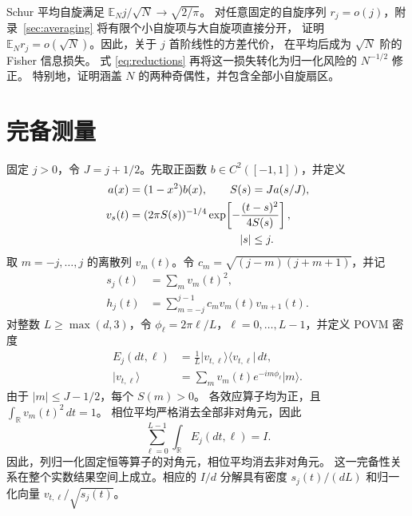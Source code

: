 \documentclass[aps,pra,reprint,superscriptaddress,longbibliography]{revtex4-2}
\theoremstyle{remark}
\newcommand{\R}{\mathbb R}
\newcommand{\ket}[1]{\lvert#1\rangle}
\newcommand{\bra}[1]{\langle#1\rvert}
\begin{document}
Schur 平均自旋满足 $\mathbb E_N j/\sqrt N\to\sqrt{2/\pi}$。
对任意固定的自旋序列 $r_j=o(j)$，附录~\ref{sec:averaging} 将有限个小自旋项与大自旋项直接分开，
证明 $\mathbb E_N r_j=o(\sqrt N)$。因此，关于 $j$ 首阶线性的方差代价，
在平均后成为 $\sqrt N$ 阶的 Fisher 信息损失。
式 \eqref{eq:reductions} 再将这一损失转化为归一化风险的 $N^{-1/2}$ 修正。
特别地，证明涵盖 $N$ 的两种奇偶性，并包含全部小自旋扇区。

\section{完备测量}\label{sec:gaussian}

固定 $j>0$，令 $J=j+1/2$。先取正函数 $b\in C^2([-1,1])$，并定义
\begin{equation}
\begin{aligned}
a(x)&=(1-x^2)b(x),\qquad S(s)=Ja(s/J),\\
v_s(t)&=(2\pi S(s))^{-1/4}
 \exp\!\left[-\frac{(t-s)^2}{4S(s)}\right],\\
&\hspace{35mm}|s|\leq j.
\end{aligned}
\label{eq:columns}
\end{equation}
取 $m=-j,\ldots,j$ 的离散列 $v_m(t)$。令 $c_m=\sqrt{(j-m)(j+m+1)}$，并记
\begin{equation}
\begin{aligned}
s_j(t)&=\sum_m v_m(t)^2,\\
h_j(t)&=\sum_{m=-j}^{j-1}c_mv_m(t)v_{m+1}(t).
\end{aligned}
\label{eq:sh}
\end{equation}
对整数 $L\geq\max(d,3)$，令 $\phi_\ell=2\pi\ell/L$，$\ell=0,\ldots,L-1$，并定义 POVM 密度
\begin{equation}
\begin{aligned}
E_j(dt,\ell)&=\frac1L\ket{v_{t,\ell}}\bra{v_{t,\ell}}\,dt,\\
\ket{v_{t,\ell}}&=\sum_m v_m(t)e^{-im\phi_\ell}\ket m.
\end{aligned}
\label{eq:gaussian-povm}
\end{equation}
由于 $|m|\leq J-1/2$，每个 $S(m)>0$。
各效应算子均为正，且 $\int_\R v_m(t)^2\,dt=1$。
相位平均严格消去全部非对角元，因此
\begin{equation}
 \sum_{\ell=0}^{L-1}\int_\R E_j(dt,\ell)=I.
 \label{eq:complete}
\end{equation}
因此，列归一化固定恒等算子的对角元，相位平均消去非对角元。
这一完备性关系在整个实数结果空间上成立。相应的 $I/d$ 分解具有密度 $s_j(t)/(dL)$ 和归一化向量 $v_{t,\ell}/\sqrt{s_j(t)}$。
\end{document}
